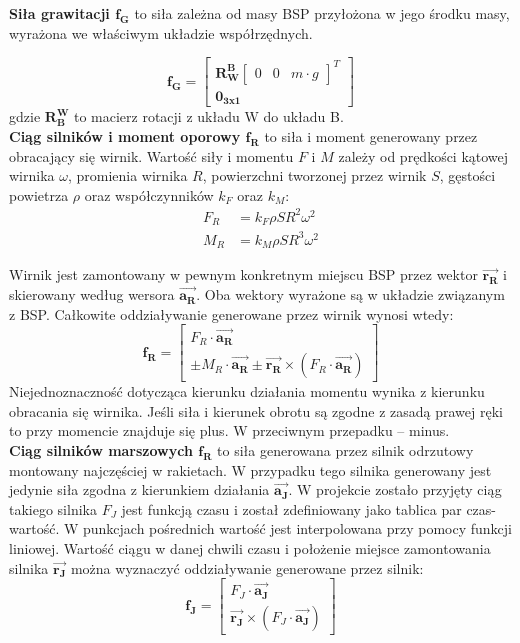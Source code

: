 \textbf{Siła grawitacji  $\bm{f_G}$} to siła zależna od masy BSP przyłożona w jego środku masy, wyrażona we właściwym układzie współrzędnych.

\[
	 \bm{f_G} = \begin{bmatrix} \bm{R_W^B}\begin{bmatrix}0 & 0 & m \cdot g\end{bmatrix}^T  \\ \bm{0_{3x1}}  \end{bmatrix} 
\]
gdzie $\bm{R_B^W}$ to macierz rotacji z układu W do układu B.\\

\textbf{Ciąg silników i moment oporowy  $\bm{f_R}$} to siła i moment generowany przez obracający się wirnik. Wartość siły i momentu $F$ i $M$ zależy od prędkości kątowej wirnika $\omega$, promienia wirnika $R$, powierzchni tworzonej przez wirnik $S$, gęstości powietrza $\rho$ oraz współczynników $k_F$ oraz $k_M$:
\[
	\begin{aligned}
	F_R & = k_F \rho S R^2 \omega^2\\
	M_R & = k_M \rho S R^3 \omega^2
	\end{aligned}
\]

Wirnik jest zamontowany w pewnym konkretnym miejscu BSP przez wektor $\bm{\vec{r_R}}$ i skierowany według wersora $\bm{\vec{a_R}}$. Oba wektory wyrażone są w układzie związanym z BSP. Całkowite oddziaływanie generowane przez wirnik wynosi wtedy:
\[
	\bm{f_R} =  \begin{bmatrix} F_R \cdot  \bm{\vec{a_R}} \\   \pm M_R \cdot \bm{\vec{a_R}} \pm  \bm{\vec{r_R}} \times \left( F_R \cdot  \bm{\vec{a_R}} \right) \end{bmatrix}
\]
Niejednoznaczność dotycząca kierunku działania momentu wynika z kierunku obracania się wirnika. Jeśli siła i kierunek obrotu są zgodne z zasadą prawej ręki to przy momencie znajduje się plus. W przeciwnym przepadku -- minus.\\

\textbf{Ciąg silników marszowych $\bm{f_R}$} to siła generowana przez silnik odrzutowy montowany najczęściej w rakietach. W przypadku tego silnika generowany jest jedynie siła zgodna z kierunkiem działania $\bm{\vec{a_J}}$. W projekcie zostało przyjęty ciąg takiego silnika $F_J$ jest funkcją czasu i został zdefiniowany jako tablica par czas-wartość. W punkcjach pośrednich wartość jest interpolowana przy pomocy funkcji liniowej. Wartość ciągu w danej chwili czasu i położenie miejsce zamontowania silnika $\bm{\vec{r_J}}$ można wyznaczyć oddziaływanie generowane przez silnik:
\[
	\bm{f_J} =  \begin{bmatrix} F_J \cdot  \bm{\vec{a_J}} \\  \bm{\vec{r_J}} \times \left( F_J \cdot  \bm{\vec{a_J}} \right) \end{bmatrix}
\]

